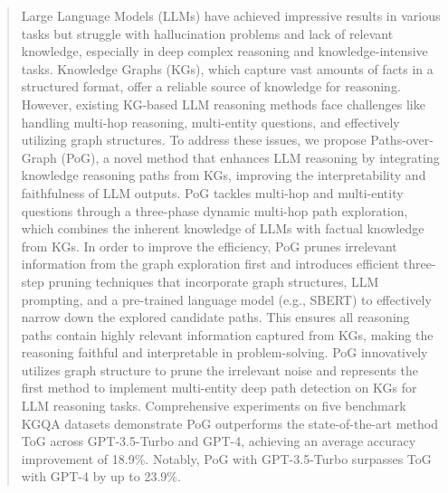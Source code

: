 \documentclass[sigconf]{acmart}
\begin{document}


\begin{abstract}

Large Language Models (LLMs) have achieved impressive results in various tasks but struggle with hallucination problems and lack of relevant knowledge, especially in deep complex reasoning and knowledge-intensive tasks. Knowledge Graphs (KGs), which capture vast amounts of facts in a structured format, offer a reliable source of knowledge for reasoning. However, existing KG-based LLM reasoning methods face challenges like handling multi-hop reasoning, multi-entity questions, and effectively utilizing graph structures. To address these issues, we propose Paths-over-Graph (PoG), a novel method that enhances LLM reasoning by integrating knowledge reasoning paths from KGs, improving the interpretability and faithfulness of LLM outputs. PoG tackles multi-hop and multi-entity questions through a three-phase dynamic multi-hop path exploration, which combines the inherent knowledge of LLMs with factual knowledge from KGs. In order to improve the efficiency, PoG prunes irrelevant information from the graph exploration first and introduces efficient three-step pruning techniques that incorporate graph structures, LLM prompting, and a pre-trained language model (e.g., SBERT) to effectively narrow down the explored candidate paths.  This ensures all reasoning paths contain highly relevant information captured from KGs, making the reasoning faithful and interpretable in problem-solving. PoG innovatively utilizes graph structure to prune the irrelevant noise and represents the first method to implement multi-entity deep path detection on KGs for LLM reasoning tasks. Comprehensive experiments on five benchmark KGQA datasets demonstrate PoG outperforms the state-of-the-art method ToG across GPT-3.5-Turbo and GPT-4, achieving an average accuracy improvement of 18.9\%. Notably, PoG with GPT-3.5-Turbo surpasses ToG with GPT-4 by up to 23.9\%. 

\end{abstract}

\end{document}
